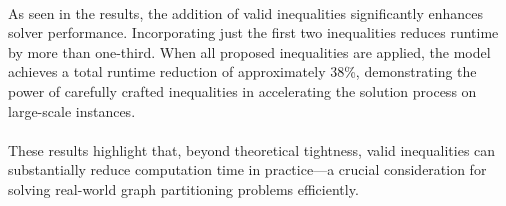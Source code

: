 \paragraph{} As seen in the results, the addition of valid inequalities significantly enhances solver performance. Incorporating just the first two inequalities reduces runtime by more than one-third. When all proposed inequalities are applied, the model achieves a total runtime reduction of approximately 38\%, demonstrating the power of carefully crafted inequalities in accelerating the solution process on large-scale instances.

\paragraph{} These results highlight that, beyond theoretical tightness, valid inequalities can substantially reduce computation time in practice—a crucial consideration for solving real-world graph partitioning problems efficiently.
